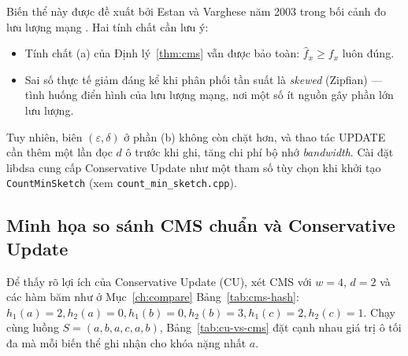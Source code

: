 Biến thể này được đề xuất bởi Estan và Varghese năm 2003 trong bối cảnh đo lưu lượng mạng \cite{estan2003conservative}. Hai tính chất cần lưu ý:

\begin{itemize}
  \item Tính chất (a) của Định lý~\ref{thm:cms} vẫn được bảo toàn: $\hat{f}_x \ge f_x$ luôn đúng.
  \item Sai số thực tế giảm đáng kể khi phân phối tần suất là \textit{skewed} (Zipfian) --- tình huống điển hình của lưu lượng mạng, nơi một số ít nguồn gây phần lớn lưu lượng.
\end{itemize}

Tuy nhiên, biên $(\varepsilon, \delta)$ ở phần (b) không còn chặt hơn, và thao tác UPDATE cần thêm một lần đọc $d$ ô trước khi ghi, tăng chi phí bộ nhớ \textit{bandwidth}. Cài đặt libdsa cung cấp Conservative Update như một tham số tùy chọn khi khởi tạo \texttt{CountMinSketch} (xem \texttt{count\_min\_sketch.cpp}).

\subsection{Minh họa so sánh CMS chuẩn và Conservative Update}

Để thấy rõ lợi ích của Conservative Update (CU), xét CMS với $w = 4$, $d = 2$ và các hàm băm như ở Mục~\ref{ch:compare} Bảng~\ref{tab:cms-hash}: $h_1(a){=}2, h_2(a){=}0, h_1(b){=}0, h_2(b){=}3, h_1(c){=}2, h_2(c){=}1$. Chạy cùng luồng $S = (a, b, a, c, a, b)$, Bảng~\ref{tab:cu-vs-cms} đặt cạnh nhau giá trị ô tối đa mà mỗi biến thể ghi nhận cho khóa nặng nhất $a$.

